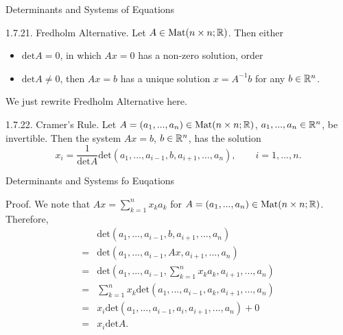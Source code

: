 \documentclass[hyperref={pdfpagelabels=true}]{beamer}
\newcommand{\Mat}{\text{Mat}}
\newcommand{\<}{\langle}
\renewcommand{\>}{\rangle}
\begin{document}
    \begin{frame}{Determinants and Systems of Equations}
        \begin{block}{1.7.21. Fredholm Alternative.}
            Let $A \in \Mat(n \times n;\R)$. Then either
            \begin{itemize}
                \item $\text{det}A = 0$, in which $Ax = 0$ has a non-zero solution, order
                \item $\text{det}A \neq 0$, then $Ax = b$ has a unique solution $x = A^{-1}b$ for any $b \in \mathbb{R}^{n}$.
            \end{itemize}
            We just rewrite Fredholm Alternative here.  
        \end{block}
        \begin{block}{1.7.22. Cramer's Rule.}
            Let $A = (a_{1},...,a_{n}) \in \Mat(n \times n;\R)$, $a_{1},...,a_{n} \in \mathbb{R}^{n}$, be invertible. Then the system $Ax = b$, $b \in \mathbb{R}^{n}$, has the solution
            \[x_{i} = \frac{1}{\text{det}A}\text{det}(a_{1},...,a_{i-1},b,a_{i+1},...,a_{n}),\qquad i = 1,...,n.\]
        \end{block}
    \end{frame}
    \begin{frame}{Determinants and Systems fo Euqations}
        \begin{block}{Proof.}
            We note that $Ax = \sum\limits _{k = 1}^{n}x_{k}a_{k}$ for $A = (a_{1},...,a_{n}) \in \Mat(n \times n;\R)$. Therefore,
            \[
                \begin{aligned}
                    &\text{det}(a_{1},...,a_{i-1},b,a_{i+1},...,a_{n})\\
                    =&\text{det}(a_{1},...,a_{i-1},Ax,a_{i+1},...,a_{n})\\
                    =&\text{det}(a_{1},...,a_{i-1},\sum_{k = 1}^{n}x_{k}a_{k},a_{i+1},...,a_{n})\\
                    =&\sum_{k = 1}^{n}x_{k}\text{det}(a_{1},...,a_{i-1},a_{k},a_{i+1},...,a_{n})\\
                    =&x_{i}\text{det}(a_{1},...,a_{i-1},a_{i},a_{i+1},...,a_{n})+0\\
                    =&x_{i}\text{det}A.
                \end{aligned}
            \]
            \end{block}
        \end{frame}
\end{document}

